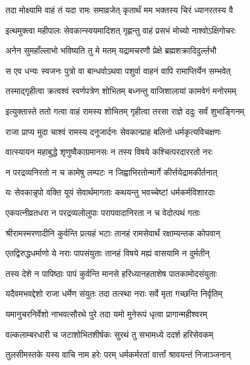 \twolineshloka
{तदा मोक्ष्यामि वाहं तं यदा रामः समाव्रजेत्}
{कृतार्थं मम भक्तस्य चिरं ध्यानरतस्य वै}%


\twolineshloka
{इत्थमुक्त्वा महीपालः सेवकान्स्वयमादिशत्}
{गृह्णन्तु वाहं प्रसभं मोच्यो नाश्वोऽक्षिगोचरः}%

\twolineshloka
{अनेन सुमहाँल्लाभो भविष्यति तु मे मतम्}
{यद्रामचरणौ प्रेक्षे ब्रह्मशक्रादिदुर्ल्लभौ}%

\twolineshloka
{स एव धन्यः स्वजनः पुत्रो वा बान्धवोऽथवा}
{पशुर्वा वाहनं वापि रामाप्तिर्येन सम्भवेत्}%

\twolineshloka
{तस्माद्गृहीत्वा क्रत्वश्वं स्वर्णपत्रेण शोभितम्}
{बध्नन्तु वाजिशालायां कामवेगं मनोरमम्}%

\twolineshloka
{इत्युक्तास्ते ततो गत्वा वाहं रामस्य शोभितम्}
{गृहीत्वा तरसा राज्ञे ददुः सर्वं शुभाङ्गिनम्}%

\twolineshloka
{राजा प्राप्य मुदा चाश्वं रामस्य दनुजार्दनः}
{सेवकान्प्राह बलिनो धर्मकृत्यविचक्षणः}%

\twolineshloka
{वात्स्यायन महाबुद्धे शृणुष्वैकाग्रमानसः}
{न तस्य विषये कश्चित्परदाररतो नरः}%

\twolineshloka
{न परद्रव्यनिरतो न च कामेषु लम्पटः}
{न जिह्वाभिरतोन्मार्गे कीर्त्तयेद्रामकीर्तनात्}%

\twolineshloka
{यः सेवकान्नृपो वक्ति यूयं सेवार्थमागताः}
{कथयन्तु भवच्चेष्टां धर्मकर्मविशारदाः}%

\twolineshloka
{एकपत्नीव्रतधरा न परद्रव्यलोलुपाः}
{परापवादानिरता न च वेदोत्पथं गताः}%

\twolineshloka
{श्रीरामस्मरणादीनि कुर्वन्ति प्रत्यहं भटाः}
{तानहं रामसेवार्थं रक्षाम्यन्तक कोपवान्}%

\twolineshloka
{एतद्विरुद्धधर्माणो ये नराः पापसंयुताः}
{तानहं विषये मह्यं वासयामि न दुर्मतीन्}%

\twolineshloka
{तस्य देशे न पापिष्ठाः पापं कुर्वन्ति मानसे}
{हरिध्यानहताशेष पातकामोदसंयुताः}%

\twolineshloka
{यदैवमभवद्देशो राजा धर्मेण संयुतः}
{तदा तत्स्था नराः सर्वे मृता गच्छन्ति निर्वृतिम्}%

\twolineshloka
{यमानुचरनिर्वेशो नाभवत्सौरथे पुरे}
{तदा यमो मुनेरूपं धृत्वा प्रागान्महीश्वरम्}%

\twolineshloka
{वल्कलाम्बरधारी च जटाशोभितशीर्षकः}
{सुरथं तु सभामध्ये ददर्श हरिसेवकम्}%

\twolineshloka
{तुलसीमस्तके यस्य वाचि नाम हरेः परम्}
{धर्मकर्मरतां वार्त्तां श्रावयन्तं निजाञ्जनान्}%

